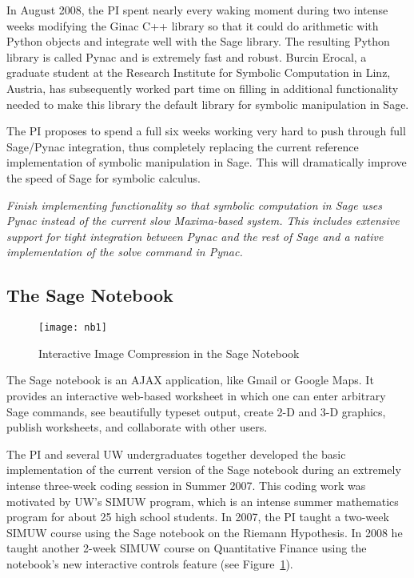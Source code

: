 \documentclass[11pt]{article}
\begin{document}
In August 2008, the PI spent nearly every waking moment during two
intense weeks modifying the Ginac C++ library so that it could do
arithmetic with Python objects and integrate well with the Sage
library.  The resulting Python library is called Pynac and is
extremely fast and robust.  Burcin Erocal, a graduate student at the
Research Institute for Symbolic Computation in Linz, Austria, has
subsequently worked part time on filling in additional functionality
needed to make this library the default library for symbolic
manipulation in Sage.

The PI proposes to spend a full six weeks working very hard to push
through full Sage/Pynac integration, thus completely replacing the
current reference implementation of symbolic manipulation in Sage.
This will dramatically improve the speed of Sage for symbolic
calculus.

\vspace{2ex}
 {\em Finish implementing 
  functionality so that symbolic computation in Sage uses Pynac
  instead of the current slow Maxima-based system.  This includes
  extensive support for tight integration between Pynac and the rest
  of Sage and a native implementation of the solve command in Pynac.}

\subsection{The Sage Notebook}
\begin{figure}
\begin{center}
\texttt{[image: nb1]}
\caption{Interactive Image Compression in the Sage Notebook\label{fig:interact}}
\end{center}
\end{figure}
The Sage notebook is an AJAX application, like Gmail or Google Maps.
It provides an interactive web-based worksheet in which one can enter
arbitrary Sage commands, see beautifully typeset output, create 2-D
and 3-D graphics, publish worksheets, and collaborate with other
users.

The PI and several UW undergraduates together developed the basic
implementation of the current version of the Sage notebook during an
extremely intense three-week coding session in Summer 2007.  This coding
work was motivated by UW's SIMUW program, which is an intense summer
mathematics program for about 25 high school students.  In 2007, the
PI taught a two-week SIMUW course using the Sage notebook on the Riemann
Hypothesis.  In 2008 he taught another 2-week SIMUW course on
Quantitative Finance using the notebook's new interactive controls
feature (see Figure~\ref{fig:interact}).
\end{document}
